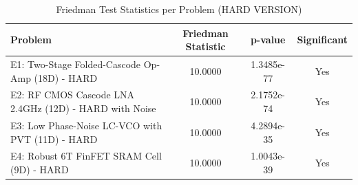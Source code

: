 \begin{table}[htbp]
\centering
\caption{Friedman Test Statistics per Problem (HARD VERSION)}
\label{tab:friedman_stats}
\small
\begin{tabular}{lccc}
\toprule
\textbf{Problem} & \textbf{Friedman Statistic} & \textbf{p-value} & \textbf{Significant} \\
\midrule
E1: Two-Stage Folded-Cascode Op-Amp (18D) - HARD & 10.0000 & 1.3485e-77 & Yes \\
E2: RF CMOS Cascode LNA 2.4GHz (12D) - HARD with Noise & 10.0000 & 2.1752e-74 & Yes \\
E3: Low Phase-Noise LC-VCO with PVT (11D) - HARD & 10.0000 & 4.2894e-35 & Yes \\
E4: Robust 6T FinFET SRAM Cell (9D) - HARD & 10.0000 & 1.0043e-39 & Yes \\
\bottomrule
\end{tabular}
\end{table}

